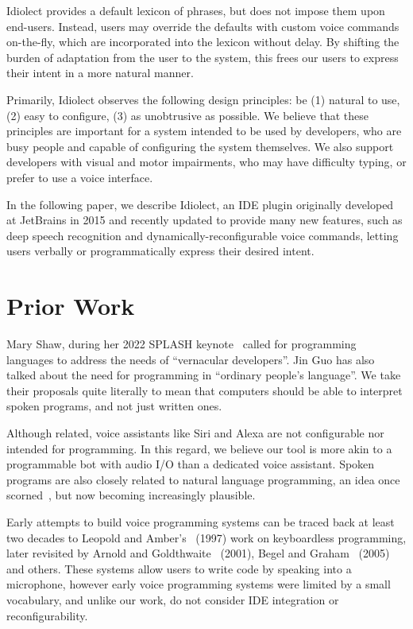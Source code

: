 \documentclass[conference]{IEEEtran}
\begin{document}
Idiolect provides a default lexicon of phrases, but does not impose them upon end-users. Instead, users may override the defaults with custom voice commands on-the-fly, which are incorporated into the lexicon without delay. By shifting the burden of adaptation from the user to the system, this frees our users to express their intent in a more natural manner.

Primarily, Idiolect observes the following design principles: be (1) natural to use, (2) easy to configure, (3) as unobtrusive as possible. We believe that these principles are important for a system intended to be used by developers, who are busy people and capable of configuring the system themselves. We also support developers with visual and motor impairments, who may have difficulty typing, or prefer to use a voice interface.

In the following paper, we describe Idiolect, an IDE plugin originally developed at JetBrains in 2015 and recently updated to provide many new features, such as deep speech recognition and dynamically-reconfigurable voice commands, letting users verbally or programmatically express their desired intent.

\section{Prior Work}

Mary Shaw, during her 2022 SPLASH keynote~\cite{shaw2022myths} called for programming languages to address the needs of ``vernacular developers''. Jin Guo has also talked about the need for programming in ``ordinary people's language''. We take their proposals quite literally to mean that computers should be able to interpret spoken programs, and not just written ones.

Although related, voice assistants like Siri and Alexa are not configurable nor intended for programming. In this regard, we believe our tool is more akin to a programmable bot with audio I/O than a dedicated voice assistant. Spoken programs are also closely related to natural language programming, an idea once scorned~\cite{dijkstra1979foolishness}, but now becoming increasingly plausible.

Early attempts to build voice programming systems can be traced back at least two decades to Leopold and Amber's~\cite{leopold1997keyboardless} (1997) work on keyboardless programming, later revisited by Arnold and Goldthwaite~\cite{arnold2000programming} (2001), Begel and Graham~\cite{begel2005spoken} (2005) and others. These systems allow users to write code by speaking into a microphone, however early voice programming systems were limited by a small vocabulary, and unlike our work, do not consider IDE integration or reconfigurability.
\end{document}
